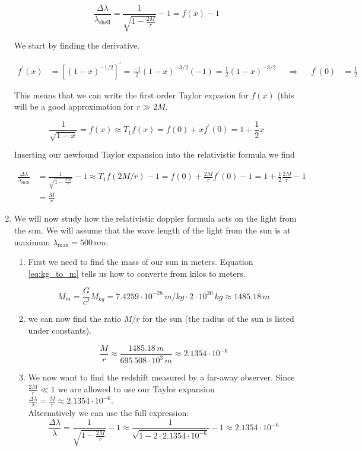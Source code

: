 \documentclass[a4paper,10pt,english]{article}
\begin{document}
\begin{enumerate}
\[\frac{\Delta \lambda}{\lambda_{\text{shell}}}=\frac{1}{\sqrt{1-\frac{2M}{r}}}-1=f(x)-1\]

We start by finding the derivative.

\begin{align*}
f^{\prime}(x)&=\left[(1-x)^{-1/2}\right]^{\prime}=\frac{-1}{2}(1-x)^{-3/2}(-1)=\frac{1}{2}(1-x)^{-3/2} &&\Rightarrow&& f^{\prime}(0)&=\frac{1}{2}
\end{align*}  

This means that we can write the first order Taylor expasion for $f(x)$ (this will be a good approximation for $r\gg 2M$.

\begin{equation*}
\frac{1}{\sqrt{1-x}}=f(x)\approx T_{1}f(x)=f(0)+xf^{\prime}(0)=1+\frac{1}{2}x
\end{equation*}

Inserting our newfound Taylor expansion into the relativistic  formula we find

\begin{align*}
\frac{\Delta \lambda}{\lambda_{\text{shell}}}&=\frac{1}{\sqrt{1-\frac{2M}{r}}}-1\approx T_{1}f(2M/r)-1=f(0)+\frac{2M}{r}f^{\prime}(0)-1=1+\frac{1}{2}\frac{2M}{r}-1\\
&=\frac{M}{r}
\end{align*}


\item We will now study how the relativistic doppler formula acts on the light from the sun. We will assume that the wave length of the light from the sun is at maximum $\lambda_{\text{max}}=500\,nm$.

\begin{enumerate}

\item First we need to find the mass of our sun in meters. Equation \ref{eq:kg_to_m} tells us how to converte from kilos to meters.

\[M_{m}=\frac{G}{c^{2}}M_{kg}=7.4259\cdot10^{-28}\,m/kg\cdot2\cdot10^{30}\,kg\approx1485.18\,m\]

\item we can now find the ratio $M/r$ for the sun (the radius of the sun is listed under constants). 

\[\frac{M}{r}\approx\frac{1485.18\,m}{695\,508\cdot10^{3}\,m}\approx2.1354\cdot10^{-6}\]

\item We now want to find the redshift measured by a far-away observer. Since $\frac{2M}{r}\ll 1$ we are allowed to use our Taylor expansion $\frac{\Delta \lambda}{\lambda}=\frac{M}{r}\approx2.1354\cdot10^{-6}$.
\\
Alternatively we can use the full expression:
\begin{equation*}
\frac{\Delta \lambda}{\lambda}=\frac{1}{\sqrt{1-\frac{2M}{r}}}-1\approx\frac{1}{\sqrt{1-2\cdot2.1354\cdot10^{-6}}}-1\approx2.1354\cdot10^{-6}
\end{equation*}
  

\end{enumerate}
\end{enumerate}
\end{document}
